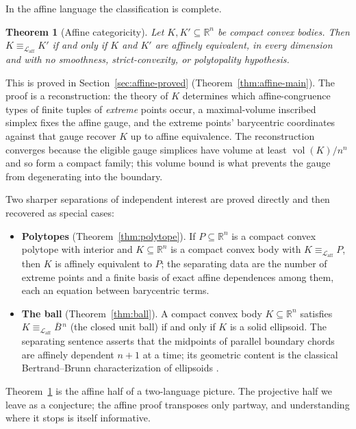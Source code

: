 \documentclass[11pt]{amsart}
\newtheorem{theorem}{Theorem}[section]
\theoremstyle{definition}
\newcommand{\R}{\mathbb{R}}
\newcommand{\Laff}{\mathcal{L}_{\mathrm{aff}}}
\newcommand{\Ball}{\overline{B}{}^{\,n}}
\begin{document}
In the affine language the classification is complete.

\begin{theorem}[Affine categoricity]\label{thm:cat-affine}
Let $K,K'\subseteq\R^n$ be compact convex bodies. Then $K\equiv_{\Laff}K'$ if
and only if $K$ and $K'$ are affinely equivalent, in every dimension and with
no smoothness, strict-convexity, or polytopality hypothesis.
\end{theorem}

This is proved in Section~\ref{sec:affine-proved}
(Theorem~\ref{thm:affine-main}). The proof is a reconstruction: the theory of
$K$ determines which affine-congruence types of finite tuples of \emph{extreme}
points occur, a maximal-volume inscribed simplex fixes the affine gauge, and
the extreme points' barycentric coordinates against that gauge recover $K$ up
to affine equivalence. The reconstruction converges because the eligible
gauge simplices have volume at least $\operatorname{vol}(K)/n^n$ and so form a
compact family; this volume bound is what prevents the gauge from degenerating
into the boundary.

Two sharper separations of independent interest are proved directly and then
recovered as special cases:

\begin{itemize}[leftmargin=2em]
\item \textbf{Polytopes} (Theorem~\ref{thm:polytope}). If $P\subseteq\R^n$
is a compact convex polytope with interior and $K\subseteq\R^n$ is a compact
convex body with $K\equiv_{\Laff} P$, then $K$ is affinely equivalent to $P$;
the separating data are the number of extreme points and a finite basis of
exact affine dependences among them, each an equation between barycentric
terms.
\item \textbf{The ball} (Theorem~\ref{thm:ball}). A compact convex body
$K\subseteq\R^n$ satisfies $K\equiv_{\Laff}\Ball$ (the closed unit ball) if
and only if $K$ is a solid ellipsoid. The separating sentence asserts that
the midpoints of parallel boundary chords are affinely dependent $n{+}1$ at a
time; its geometric content is the classical Bertrand--Brunn characterization
of ellipsoids \cite{Brunn1889, MMO19, Soltan05}.
\end{itemize}

Theorem~\ref{thm:cat-affine} is the affine half of a two-language picture.
The projective half we leave as a conjecture; the affine proof transposes only
partway, and understanding where it stops is itself informative.
\end{document}
